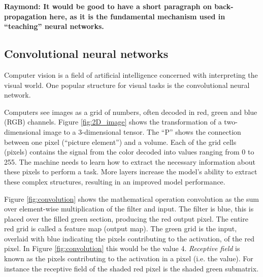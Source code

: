 \textbf{Raymond: It would be good to have a short paragraph on back-propagation here, as it is the fundamental mechanism used in ``teaching'' neural networks.}

\subsection{Convolutional neural networks} \label{sec:convolutional neural network}

Computer vision is a field of artificial intelligence concerned with interpreting the visual world. One popular structure for visual tasks is the convolutional neural network. %

Computers see images as a grid of numbers, often decoded in red, green and blue (RGB) channels. Figure \ref{fig:2D_image} shows the transformation of a two-dimensional image to a 3-dimensional tensor. The ``P'' shows the connection between one pixel (``picture element'') and a volume. Each of the grid cells (pixels) contains the signal from the color decoded into values ranging from 0 to 255. The machine needs to learn how to extract the necessary information about these pixels to perform a task. More layers increase the model's ability to extract these complex structures, resulting in an improved model performance. 


Figure \ref{fig:convolution} shows the mathematical operation convolution as the sum over element-wise multiplication of the filter and input. The filter is blue, this is placed over the filled green section, producing the red output pixel. The entire red grid is called a feature map (output map). The green grid is the input, overlaid with blue indicating the pixels contributing to the activation, of the red pixel. In Figure \ref{fig:convolution} this would be the value 4. \textit{Receptive field} is known as the pixels contributing to the activation in a pixel (i.e. the value). For instance the receptive field of the shaded red pixel is the shaded green submatrix.

